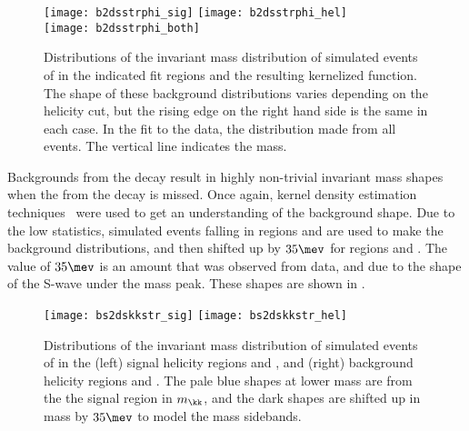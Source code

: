 \begin{figure}
  \begin{center}
    \texttt{[image: b2dsstrphi\_sig]}
    \texttt{[image: b2dsstrphi\_hel]}\\
    \texttt{[image: b2dsstrphi\_both]}
    \caption[Shape contributions from \btodsstrphi]
    {
      Distributions of the invariant mass distribution of simulated events of \btodsstrphi
      in the indicated fit regions and the resulting kernelized function.
      The shape of these background distributions varies depending on the helicity cut, but the
      rising edge on the right hand side is the same in each case.
      In the fit to the data, the distribution made from all events.
      The vertical line indicates the \Bp mass.
    }
    \label{fig:dsphi:dsstrphi}
  \end{center}
\end{figure}






Backgrounds from the decay \bstodskstrk result in highly non-trivial invariant mass shapes when the
\pip from the \Kstarz decay is missed.
Once again, kernel density estimation techniques~\cite{Cranmer:2000du} were used to get an
understanding of the background shape.
Due to the low statistics, simulated \bstodskstrk events falling in regions \rA and \rB are used to
make the background distributions, and then shifted up by $35\mev$ for regions \rC and \rD.
The value of $35\mev$ is an amount that was observed from data, and due to the shape of the \kk
S-wave under the \phii mass peak.
These shapes are shown in .

\begin{figure}
  \begin{center}
    \texttt{[image: bs2dskkstr\_sig]}
    \texttt{[image: bs2dskkstr\_hel]}
    \caption[Shapes of background contributions of \bstodskstrk]
    {\small
      Distributions of the invariant mass distribution of simulated events of \bstodskstrk in the
      (left) signal helicity regions \rA and \rB, and
      (right) background helicity regions \rC and \rD.
      The pale blue shapes at lower mass are from the the signal region in $m_\kk$, and the dark
      shapes are shifted up in mass by $35\mev$ to model the \phii mass sidebands.
    }
    \label{fig:dsphi:bstodskstrk}
  \end{center}
\end{figure}

